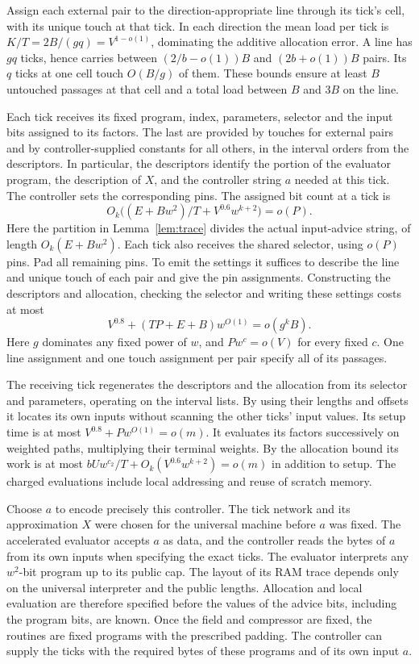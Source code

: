 Assign each external pair to the direction-appropriate line through
its tick's cell, with its unique touch at that tick. In each direction
the mean load per tick is $K/T=2B/(gq)=V^{1-o(1)}$, dominating the
additive allocation error. A line has $gq$ ticks, hence carries
between $(2/b-o(1))B$ and $(2b+o(1))B$ pairs. Its $q$ ticks at one
cell touch $O(B/g)$ of them. These bounds ensure at least $B$ untouched
passages at that cell and a total load between $B$ and $3B$ on the line.

Each tick receives its fixed program, index, parameters, selector
and the input bits assigned to its factors. The last are provided by
touches for external pairs and by controller-supplied constants for all
others, in the interval orders from the descriptors. In particular, the descriptors identify the portion of the evaluator
program, the description of $X$, and the controller string $a$ needed
at this tick. The controller sets the corresponding pins. The assigned bit
count at a tick is
\[
       O_k\bigl((E+Bw^2)/T+V^{0.6}w^{k+2}\bigr)=o(P).
\]
Here the partition in Lemma~\ref{lem:trace} divides the actual
input-advice string, of length $O_k(E+Bw^2)$. Each tick also receives
the shared selector, using $o(P)$ pins. Pad all remaining pins. To emit
the settings it suffices to describe the line and unique touch of
each pair and give the pin assignments. Constructing the descriptors
and allocation, checking the selector and writing these settings costs
at most
\[
             V^{0.8}+(TP+E+B)w^{O(1)}=o(g^kB).
\]
Here $g$ dominates any fixed power of $w$, and
$Pw^c=o(V)$ for every fixed $c$. One line assignment and one touch assignment per pair specify all of
its passages.

The receiving tick regenerates the descriptors and the allocation from
its selector and parameters, operating on the interval lists. By using
their lengths and offsets it locates its own inputs without scanning the
other ticks' input values. Its setup time is at most
$V^{0.8}+Pw^{O(1)}=o(m)$. It evaluates its factors successively on
weighted paths, multiplying their terminal weights. By the allocation
bound its work is at most $bUw^{c_2}/T+O_k(V^{0.6}w^{k+2})=o(m)$
in addition to setup. The charged evaluations include local addressing
and reuse of scratch memory.

Choose $a$ to encode precisely this controller. The tick network and
its approximation $X$ were chosen for the universal machine before $a$
was fixed. The accelerated evaluator accepts $a$ as data, and the
controller reads the bytes of $a$ from its own inputs when specifying
the exact ticks. The evaluator interprets any $w^2$-bit program up to its public cap.
The layout of its RAM trace depends only on the universal interpreter
and the public lengths. Allocation and local evaluation are therefore
specified before the values of the advice bits, including the program
bits, are known. Once the field and compressor are fixed, the routines
are fixed programs with the prescribed padding. The controller can
supply the ticks with the required bytes of these programs and of its
own input $a$.

